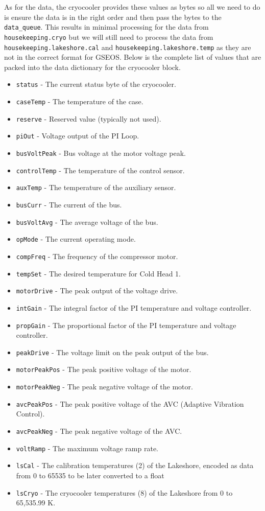 As for the data, the cryocooler provides these values as bytes so all we need to do is ensure the data is in the right order and then pass the bytes to the \texttt{data\_queue}. 
This results in minimal processing for the data from \texttt{housekeeping.cryo} but we will still need to process the data from \texttt{housekeeping.lakeshore.cal} and \texttt{housekeeping.lakeshore.temp} as they are not in the correct format for GSEOS.
Below is the complete list of values that are packed into the data dictionary for the cryocooler block.
\begin{itemize}
    \item \texttt{status} - The current status byte of the cryocooler.
    \item \texttt{caseTemp} - The temperature of the case.
    \item \texttt{reserve} - Reserved value (typically not used).
    \item \texttt{piOut} - Voltage output of the PI Loop.
    \item \texttt{busVoltPeak} - Bus voltage at the motor voltage peak.
    \item \texttt{controlTemp} - The temperature of the control sensor.
    \item \texttt{auxTemp} - The temperature of the auxiliary sensor.
    \item \texttt{busCurr} - The current of the bus.
    \item \texttt{busVoltAvg} - The average voltage of the bus.
    \item \texttt{opMode} - The current operating mode.
    \item \texttt{compFreq} - The frequency of the compressor motor.
    \item \texttt{tempSet} - The desired temperature for Cold Head 1.
    \item \texttt{motorDrive} - The peak output of the voltage drive.
    \item \texttt{intGain} - The integral factor of the PI temperature and voltage controller.
    \item \texttt{propGain} - The proportional factor of the PI temperature and voltage controller.
    \item \texttt{peakDrive} - The voltage limit on the peak output of the bus.
    \item \texttt{motorPeakPos} - The peak positive voltage of the motor.
    \item \texttt{motorPeakNeg} - The peak negative voltage of the motor.
    \item \texttt{avcPeakPos} - The peak positive voltage of the AVC (Adaptive Vibration Control).
    \item \texttt{avcPeakNeg} - The peak negative voltage of the AVC.
    \item \texttt{voltRamp} - The maximum voltage ramp rate.
    \item \texttt{lsCal} - The calibration temperatures (2) of the Lakeshore, encoded as data from 0 to 65535 to be later converted to a float
    \item \texttt{lsCryo} - The cryocooler temperatures (8) of the Lakeshore from 0 to 65,535.99 K. 
\end{itemize}

